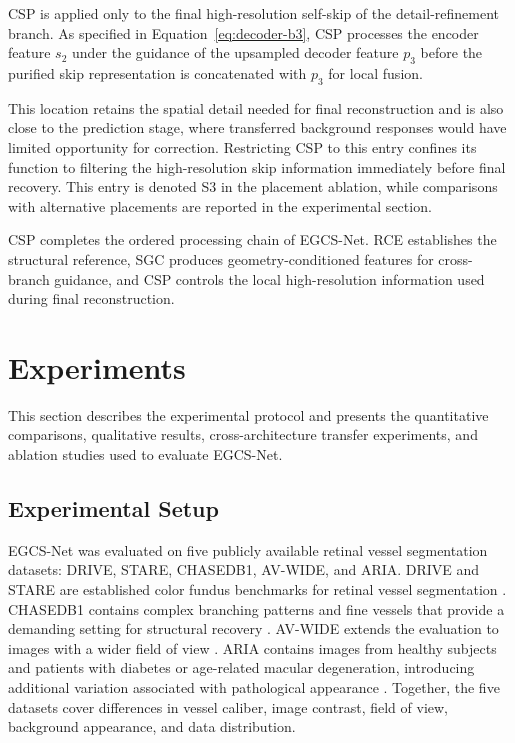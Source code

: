 \documentclass[a4paper,fleqn]{cas-sc}
\begin{document}
CSP is applied only to the final high-resolution self-skip of the detail-refinement branch.
As specified in Equation~\eqref{eq:decoder-b3}, CSP processes the encoder feature \(s_2\) under the guidance of the upsampled decoder feature \(p_3\) before the purified skip representation is concatenated with \(p_3\) for local fusion.

This location retains the spatial detail needed for final reconstruction and is also close to the prediction stage, where transferred background responses would have limited opportunity for correction.
Restricting CSP to this entry confines its function to filtering the high-resolution skip information immediately before final recovery.
This entry is denoted S3 in the placement ablation, while comparisons with alternative placements are reported in the experimental section.

CSP completes the ordered processing chain of EGCS-Net.
RCE establishes the structural reference, SGC produces geometry-conditioned features for cross-branch guidance, and CSP controls the local high-resolution information used during final reconstruction.

\section{Experiments}

This section describes the experimental protocol and presents the quantitative comparisons, qualitative results, cross-architecture transfer experiments, and ablation studies used to evaluate EGCS-Net.

\subsection{Experimental Setup}
\label{sec:experimental-setup}

EGCS-Net was evaluated on five publicly available retinal vessel segmentation datasets: DRIVE, STARE, CHASEDB1, AV-WIDE, and ARIA. DRIVE and STARE are established color fundus benchmarks for retinal vessel segmentation \cite{staal2004ridge,hoover2000locating}. CHASEDB1 contains complex branching patterns and fine vessels that provide a demanding setting for structural recovery \cite{fraz2012ensemble}. AV-WIDE extends the evaluation to images with a wider field of view \cite{khanal2020dynamic}. ARIA contains images from healthy subjects and patients with diabetes or age-related macular degeneration, introducing additional variation associated with pathological appearance \cite{farnell2008enhancement}. Together, the five datasets cover differences in vessel caliber, image contrast, field of view, background appearance, and data distribution.
\end{document}
